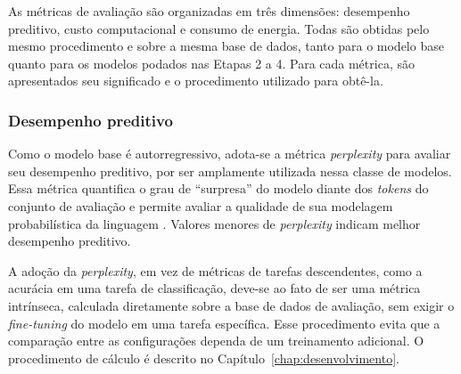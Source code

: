 As métricas de avaliação são organizadas em três dimensões: desempenho preditivo, custo
computacional e consumo de energia. Todas são obtidas pelo mesmo procedimento e sobre a
mesma base de dados, tanto para o modelo base quanto para os modelos podados nas Etapas 2 a
4. Para cada métrica, são apresentados seu significado e o procedimento utilizado para
obtê-la.

\subsubsection{Desempenho preditivo}

Como o modelo base é autorregressivo, adota-se a métrica \textit{perplexity} para avaliar
seu desempenho preditivo, por ser amplamente utilizada nessa classe de modelos. Essa
métrica quantifica o grau de ``surpresa'' do modelo diante dos \textit{tokens} do conjunto
de avaliação e permite avaliar a qualidade de sua modelagem probabilística da linguagem
\cite{Goodfellow2016}. Valores menores de \textit{perplexity} indicam melhor desempenho
preditivo.

A adoção da \textit{perplexity}, em vez de métricas de tarefas descendentes, como a
acurácia em uma tarefa de classificação, deve-se ao fato de ser uma métrica intrínseca,
calculada diretamente sobre a base de dados de avaliação, sem exigir o \textit{fine-tuning}
do modelo em uma tarefa específica. Esse procedimento evita que a comparação entre as
configurações dependa de um treinamento adicional. O procedimento de cálculo é descrito no
Capítulo~\ref{chap:desenvolvimento}.

